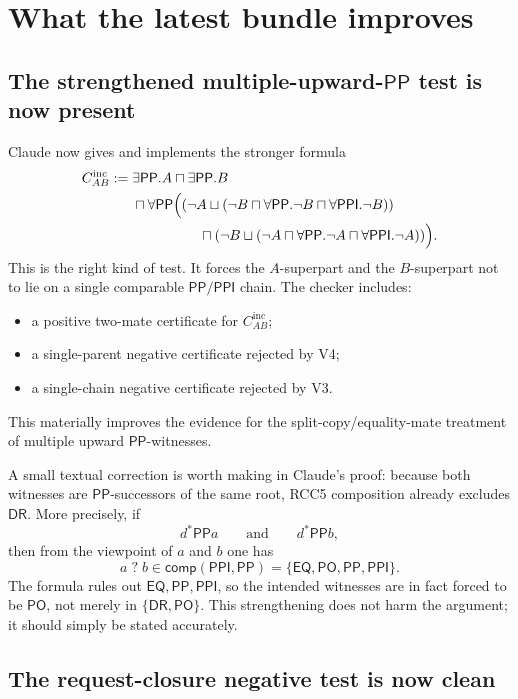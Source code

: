 \documentclass[11pt]{article}
\newcommand{\PP}{\mathsf{PP}}
\newcommand{\PPI}{\mathsf{PPI}}
\newcommand{\DR}{\mathsf{DR}}
\newcommand{\PO}{\mathsf{PO}}
\newcommand{\EQ}{\mathsf{EQ}}
\begin{document}
\section{What the latest bundle improves}

\subsection{The strengthened multiple-upward-\texorpdfstring{\(\PP\)}{PP} test is now present}

Claude now gives and implements the stronger formula
\[
\begin{aligned}
C_{AB}^{\mathrm{inc}} := {}& \exists\PP.A \sqcap \exists\PP.B \\
&{}\sqcap \forall\PP\Bigl(
  (\neg A \sqcup (\neg B \sqcap \forall\PP.\neg B \sqcap \forall\PPI.\neg B)) \\
&\hspace{4.8em}{}\sqcap
  (\neg B \sqcup (\neg A \sqcap \forall\PP.\neg A \sqcap \forall\PPI.\neg A))
\Bigr).
\end{aligned}
\]
This is the right kind of test.  It forces the \(A\)-superpart and the \(B\)-superpart not to lie on a single comparable \(\PP/\PPI\) chain.  The checker includes:
\begin{itemize}[leftmargin=2em]
  \item a positive two-mate certificate for \(C_{AB}^{\mathrm{inc}}\);
  \item a single-parent negative certificate rejected by V4;
  \item a single-chain negative certificate rejected by V3.
\end{itemize}
This materially improves the evidence for the split-copy/equality-mate treatment of multiple upward \(\PP\)-witnesses.

A small textual correction is worth making in Claude's proof: because both witnesses are \(\PP\)-successors of the same root, RCC5 composition already excludes \(\DR\).  More precisely, if
\[
d^*\PP a
\qquad\text{and}\qquad
 d^*\PP b,
\]
then from the viewpoint of \(a\) and \(b\) one has
\[
a\;?\;b \in \mathsf{comp}(\PPI,\PP)=\{\EQ,\PO,\PP,\PPI\}.
\]
The formula rules out \(\EQ,\PP,\PPI\), so the intended witnesses are in fact forced to be \(\PO\), not merely in \(\{\DR,\PO\}\).  This strengthening does not harm the argument; it should simply be stated accurately.

\subsection{The request-closure negative test is now clean}
\end{document}
